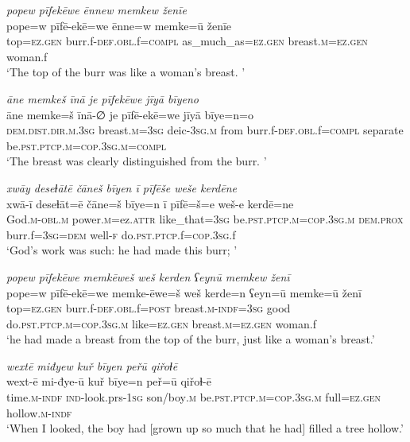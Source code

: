 \ea \label{ZQ.40}
\textit{popew pīfekēwe ēnnew memkew ženīe} \\ 
\gll pope=w pīfē-ekē=we ēnne=w memke=ū ženīe \\ 
 top\textsc{=ez.gen} burr.f\textsc{-def}\textsc{.obl}.f\textsc{=compl} as\_much\_as\textsc{=ez.gen} breast\textsc{.m}\textsc{=ez.gen} woman.f \\ 
\glt `The top of the burr was like a woman’s breast. '
\z 
 
\ea \label{ZQ.41}
\textit{āne memkeš īnā je pīfekēwe jīyā bīyeno} \\ 
\gll āne memke=š īnā-∅ je pīfē-ekē=we jīyā bīye=n=o \\ 
 \textsc{dem.dist}\textsc{.dir}\textsc{.m}\textsc{.3sg} breast\textsc{.m}\textsc{=3sg} deic\textsc{-3sg}\textsc{.m} from burr.f\textsc{-def}\textsc{.obl}.f\textsc{=compl} separate be\textsc{.pst}\textsc{.ptcp}\textsc{.m}\textsc{=cop}\textsc{.3sg}\textsc{.m}\textsc{=compl} \\ 
\glt `The breast was clearly distinguished from the burr. '
\z 
 
\ea \label{ZQ.42}
\textit{xwāy deseɫātē čāneš bīyen ī pīfēše weše kerdēne} \\ 
\gll xwā-ī deseɫāt=ē čāne=š bīye=n ī pīfē=š=e weš-e kerdē=ne \\ 
 God\textsc{.m}\textsc{-obl}\textsc{.m} power\textsc{.m}=ez.\textsc{attr} like\_that\textsc{=3sg} be\textsc{.pst}\textsc{.ptcp}\textsc{.m}\textsc{=cop}\textsc{.3sg}\textsc{.m} \textsc{dem.prox} burr.f\textsc{=3sg}\textsc{=dem} well\textsc{-f} do\textsc{.pst}\textsc{.ptcp}.f\textsc{=cop}\textsc{.3sg}.f \\ 
\glt `God’s work was such: he had made this burr; '
\z 
 
\ea \label{ZQ.43}
\textit{popew pīfekēwe memkēweš weš kerden ʕeynū memkew ženī} \\ 
\gll pope=w pīfē-ekē=we memke-ēwe=š weš kerde=n ʕeyn=ū memke=ū ženī \\ 
 top\textsc{=ez.gen} burr.f\textsc{-def}\textsc{.obl}.f\textsc{=\textsc{post}} breast\textsc{.m}\textsc{-indf}\textsc{=3sg} good do\textsc{.pst}\textsc{.ptcp}\textsc{.m}\textsc{=cop}\textsc{.3sg}\textsc{.m} like\textsc{=ez.gen} breast\textsc{.m}\textsc{=ez.gen} woman.f \\ 
\glt `he had made a breast from the top of the burr, just like a woman’s breast.'
\z 
 
\ea \label{ZQ.45}
\textit{wextē miđyew kuř bīyen peřū qiřoɫē} \\ 
\gll wext-ē mi-đye-ū kuř bīye=n peř=ū qiřoɫ-ē \\ 
 time\textsc{.m}\textsc{-indf} \textsc{ind-}look.prs\textsc{-\textsc{1sg}} son/boy\textsc{.m} be\textsc{.pst}\textsc{.ptcp}\textsc{.m}\textsc{=cop}\textsc{.3sg}\textsc{.m} full\textsc{=ez.gen} hollow\textsc{.m}\textsc{-indf} \\ 
\glt `When I looked, the boy had [grown up so much that he had] filled a tree hollow.'
\z 
 
